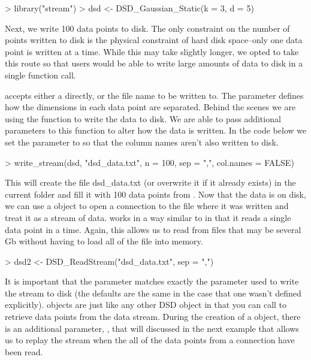 \documentclass[nojss]{jss}
\begin{document}
\begin{Schunk}
\begin{Sinput}
> library("stream")
> dsd <- DSD_Gaussian_Static(k = 3, d = 5)
\end{Sinput}
\end{Schunk}

Next, we write 100 data points to disk. The only constraint on the number of points written to disk is the physical constraint of hard disk space--only one data point is written at a time. While this may take slightly longer, we opted to take this route so that users would be able to write large amounts of data to disk in a single function call.

 accepts either a  directly, or the file name to be written to. The  parameter defines how the dimensions in each data point are separated. Behind the scenes we are using the  function to write the data to disk. We are able to pass additional parameters to this function to alter how the data is written. In the code below we set the  parameter to  so that the column names aren't also written to disk.

\begin{Schunk}
\begin{Sinput}
> write_stream(dsd, "dsd_data.txt", n = 100, sep = ",", col.names = FALSE)
\end{Sinput}
\end{Schunk}

This will create the file dsd\_data.txt (or overwrite it if it already exists) in the current folder and fill it with 100 data points from . Now that the data is on disk, we can use a  object to open a connection to the file where it was written and treat it as a stream of data.  works in a way similar to  in that it reads a single data point in a time. Again, this allows us to read from files that may be several Gb without having to load all of the file into memory.

\begin{Schunk}
\begin{Sinput}
> dsd2 <- DSD_ReadStream("dsd_data.txt", sep = ",")
\end{Sinput}
\end{Schunk}

It is important that the  parameter matches exactly the  parameter used to write the stream to disk (the defaults are the same in the case that one wasn't defined explicitly).  objects are just like any other DSD object in that you can call  to retrieve data points from the data stream. During the creation of a  object, there is an additional parameter, , that will discussed in the next example that allows us to replay the stream when the all of the data points from a connection have been read. 
\end{document}
